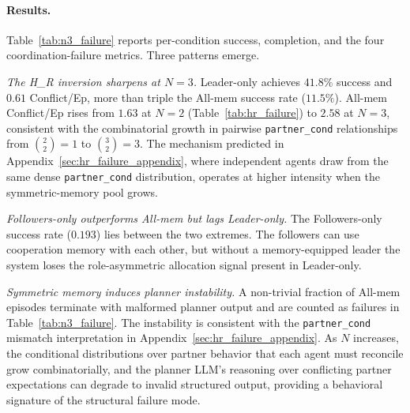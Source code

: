 \documentclass{article}
\theoremstyle{plain}
\theoremstyle{definition}
\theoremstyle{remark}
\begin{document}
\paragraph{Results.} Table~\ref{tab:n3_failure} reports per-condition success, completion, and the four coordination-failure metrics. Three patterns emerge.

\textit{The H\_R inversion sharpens at $N{=}3$.} Leader-only achieves $41.8\%$ success and $0.61$ Conflict/Ep, more than triple the All-mem success rate ($11.5\%$). All-mem Conflict/Ep rises from $1.63$ at $N{=}2$ (Table~\ref{tab:hr_failure}) to $2.58$ at $N{=}3$, consistent with the combinatorial growth in pairwise \texttt{partner\_cond} relationships from $\binom{2}{2}{=}1$ to $\binom{3}{2}{=}3$. The mechanism predicted in Appendix~\ref{sec:hr_failure_appendix}, where independent agents draw from the same dense \texttt{partner\_cond} distribution, operates at higher intensity when the symmetric-memory pool grows.

\textit{Followers-only outperforms All-mem but lags Leader-only.} The Followers-only success rate ($0.193$) lies between the two extremes. The followers can use cooperation memory with each other, but without a memory-equipped leader the system loses the role-asymmetric allocation signal present in Leader-only.

\textit{Symmetric memory induces planner instability.} A non-trivial fraction of All-mem episodes terminate with malformed planner output and are counted as failures in Table~\ref{tab:n3_failure}. The instability is consistent with the \texttt{partner\_cond} mismatch interpretation in Appendix~\ref{sec:hr_failure_appendix}. As $N$ increases, the conditional distributions over partner behavior that each agent must reconcile grow combinatorially, and the planner LLM's reasoning over conflicting partner expectations can degrade to invalid structured output, providing a behavioral signature of the structural failure mode.

\begin{table}[h]
\centering
\caption{$N{=}3$ deployment ablation on H\_R with Llama-3.1-8B. The 2-agent inversion in Table~\ref{tab:hr_failure} sharpens. All-mem Conflict/Ep rises from $1.63$ to $2.58$, and Leader-only success more than triples All-mem.}
\label{tab:n3_failure}
\end{table}
\end{document}
